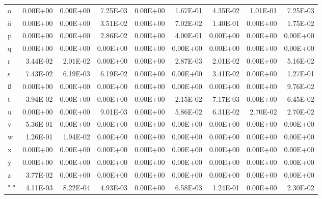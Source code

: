 \documentclass[11pt,a4paper]{CLabBookTemplate} %
\begin{document}
\begin{table}[htbp]
\begin{tabular}{lrrrrrrrr}
		o     & 0.00E+00 & 0.00E+00 & 7.25E-03 & 0.00E+00 & 1.67E-01 & 4.35E-02 & 1.01E-01 & 7.25E-03 \\
		ö     & 0.00E+00 & 0.00E+00 & 3.51E-02 & 0.00E+00 & 7.02E-02 & 1.40E-01 & 0.00E+00 & 1.75E-02 \\
		p     & 0.00E+00 & 0.00E+00 & 2.86E-02 & 0.00E+00 & 4.00E-01 & 0.00E+00 & 0.00E+00 & 0.00E+00 \\
		q     & 0.00E+00 & 0.00E+00 & 0.00E+00 & 0.00E+00 & 0.00E+00 & 0.00E+00 & 0.00E+00 & 0.00E+00 \\
		r     & 3.44E-02 & 2.01E-02 & 0.00E+00 & 0.00E+00 & 2.87E-03 & 2.01E-02 & 0.00E+00 & 5.16E-02 \\
		s     & 7.43E-02 & 6.19E-03 & 6.19E-02 & 0.00E+00 & 0.00E+00 & 3.41E-02 & 0.00E+00 & 1.27E-01 \\
		ß     & 0.00E+00 & 0.00E+00 & 0.00E+00 & 0.00E+00 & 0.00E+00 & 0.00E+00 & 0.00E+00 & 9.76E-02 \\
		t     & 3.94E-02 & 0.00E+00 & 0.00E+00 & 0.00E+00 & 2.15E-02 & 7.17E-03 & 0.00E+00 & 6.45E-02 \\
		u     & 0.00E+00 & 0.00E+00 & 9.01E-03 & 0.00E+00 & 5.86E-02 & 6.31E-02 & 2.70E-02 & 2.70E-02 \\
		v     & 5.36E-01 & 0.00E+00 & 0.00E+00 & 0.00E+00 & 0.00E+00 & 0.00E+00 & 0.00E+00 & 0.00E+00 \\
		w     & 1.26E-01 & 1.94E-02 & 0.00E+00 & 0.00E+00 & 0.00E+00 & 0.00E+00 & 0.00E+00 & 0.00E+00 \\
		x     & 0.00E+00 & 0.00E+00 & 0.00E+00 & 0.00E+00 & 0.00E+00 & 0.00E+00 & 0.00E+00 & 0.00E+00 \\
		y     & 0.00E+00 & 0.00E+00 & 0.00E+00 & 0.00E+00 & 0.00E+00 & 0.00E+00 & 0.00E+00 & 0.00E+00 \\
		z     & 3.77E-02 & 0.00E+00 & 0.00E+00 & 0.00E+00 & 0.00E+00 & 0.00E+00 & 0.00E+00 & 0.00E+00 \\
		" "   & 4.11E-03 & 8.22E-04 & 4.93E-03 & 0.00E+00 & 6.58E-03 & 1.24E-01 & 0.00E+00 & 2.30E-02 \\
	\end{tabular}%
	\label{tab:ProbTrans3}%
\end{table}%
\end{document}
